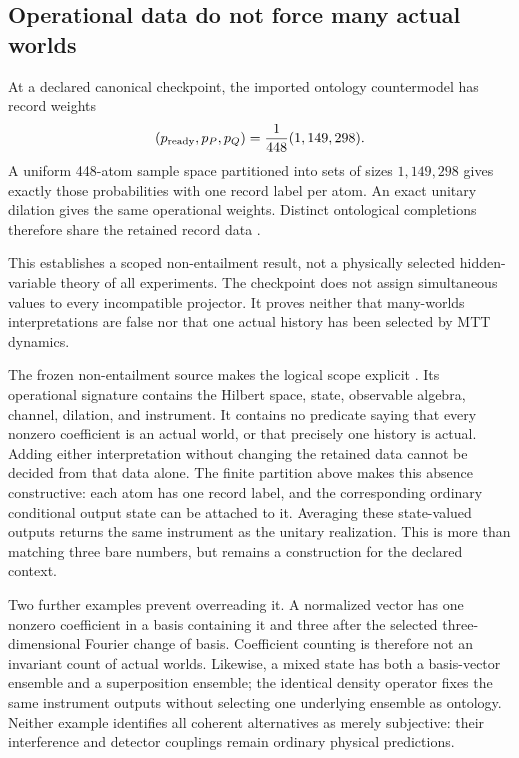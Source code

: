 \documentclass[11pt,a4paper]{article}
\begin{document}
\subsection{Operational data do not force many actual worlds}
\label{sec:ontology-nonentailment}
At a declared canonical checkpoint, the imported ontology countermodel has record weights
\begin{equation}
(p_{\rm ready},p_P,p_Q)=\frac1{448}(1,149,298).
\label{eq:448}
\end{equation}
A uniform 448-atom sample space partitioned into sets of sizes \(1,149,298\) gives exactly those probabilities with one record label per atom. An exact unitary dilation gives the same operational weights. Distinct ontological completions therefore share the retained record data \cite{NeroResults}.

This establishes a scoped non-entailment result, not a physically selected hidden-variable theory of all experiments. The checkpoint does not assign simultaneous values to every incompatible projector. It proves neither that many-worlds interpretations are false nor that one actual history has been selected by MTT dynamics.

The frozen non-entailment source makes the logical scope explicit
\cite{NeroOntologyFrozen}. Its operational signature contains the Hilbert
space, state, observable algebra, channel, dilation, and instrument. It
contains no predicate saying that every nonzero coefficient is an actual
world, or that precisely one history is actual. Adding either interpretation
without changing the retained data cannot be decided from that data alone.
The finite partition above makes this absence constructive: each atom has
one record label, and the corresponding ordinary conditional output state
can be attached to it. Averaging these state-valued outputs returns the same
instrument as the unitary realization. This is more than matching three
bare numbers, but remains a construction for the declared context.

Two further examples prevent overreading it. A normalized vector has one
nonzero coefficient in a basis containing it and three after the selected
three-dimensional Fourier change of basis. Coefficient counting is therefore
not an invariant count of actual worlds. Likewise, a mixed state has both
a basis-vector ensemble and a superposition ensemble; the identical density
operator fixes the same instrument outputs without selecting one underlying
ensemble as ontology. Neither example identifies all coherent alternatives
as merely subjective: their interference and detector couplings remain
ordinary physical predictions.
\end{document}
